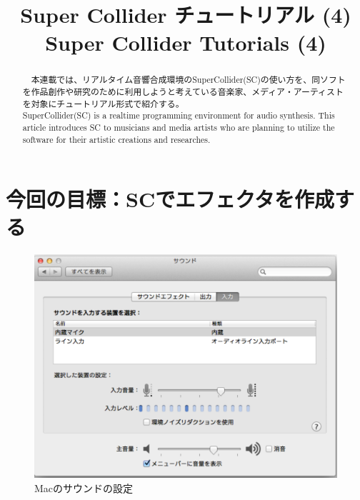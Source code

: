 \documentclass{jsarticle}
\title{Super Collider チュートリアル (4)\\ 
Super Collider Tutorials (4)
}
\begin{document}
\makeatletter 
\def\ps@myheadings{%
\let\ps@jpl@in\ps@plain%
\def\@evenhead{\reset@font\hfil\leftmark\hfil}%
\def\@oddhead{\reset@font\hfil\rightmark\hfil}%
\let\@mkboth\@gobbletwo%
\let\sectionmark\@gobble%
\let\subsectionmark\@gobble%
% 
\def\@oddfoot{\reset@font\hfil-- \thepage --\hfil}%
\let\@evenfoot\@oddfoot 
} 
\makeatother 


\setcounter{page}{ 3 } 
\pagestyle{myheadings} 




\maketitle
\thispagestyle{myheadings}

%
\begin{abstract}
　本連載では、リアルタイム音響合成環境のSuperCollider(SC)の使い方を、同ソフトを作品創作や研究のために利用しようと考えている音楽家、メディア・アーティストを対象にチュートリアル形式で紹介する。\\
SuperCollider(SC) is a realtime programming environment for audio synthesis. This article introduces SC to musicians and media artists who are planning to utilize the software for their artistic creations and researches.

\end{abstract}
%
\section{今回の目標：SCでエフェクタを作成する}

\begin{figure}[h]
	\begin{center}
		\includegraphics[scale=0.3]{setting.pdf}
	\end{center}
	\caption{Macのサウンドの設定}
	\label{fig:internal_mic}
\end{figure}
\end{document}
